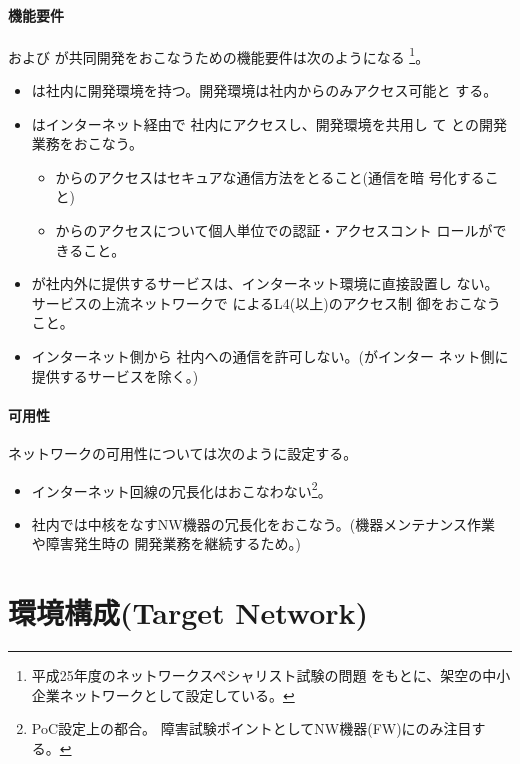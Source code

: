     \paragraph{機能要件}
\yo および \tj が共同開発をおこなうための機能要件は次のようになる
\footnote{平成25年度のネットワークスペシャリスト試験の問題\cite{h25nwsp}
をもとに、架空の中小企業ネットワークとして設定している。}。
\begin{itemize}
 \item \yo は社内に開発環境を持つ。開発環境は社内からのみアクセス可能と
       する。
 \item \tj はインターネット経由で \yo 社内にアクセスし、開発環境を共用し
       て \yo との開発業務をおこなう。
       \begin{itemize}
        \item \tj からのアクセスはセキュアな通信方法をとること(通信を暗
              号化すること)
        \item \tj からのアクセスについて個人単位での認証・アクセスコント
              ロールができること。
       \end{itemize}
 \item \yo が社内外に提供するサービスは、インターネット環境に直接設置し
       ない。サービスの上流ネットワークで \yo によるL4(以上)のアクセス制
       御をおこなうこと。
 \item インターネット側から \yo 社内への通信を許可しない。(\yo がインター
       ネット側に提供するサービスを除く。)
\end{itemize}

    \paragraph{可用性}

ネットワークの可用性については次のように設定する。
\begin{itemize}
 \item インターネット回線の冗長化はおこなわない\footnote{PoC設定上の都合。
       障害試験ポイントとしてNW機器(FW)にのみ注目する。}。
 \item 社内では中核をなすNW機器の冗長化をおこなう。(機器メンテナンス作業
       や障害発生時の \tj 開発業務を継続するため。)
\end{itemize}

 \section{環境構成(Target Network)}

